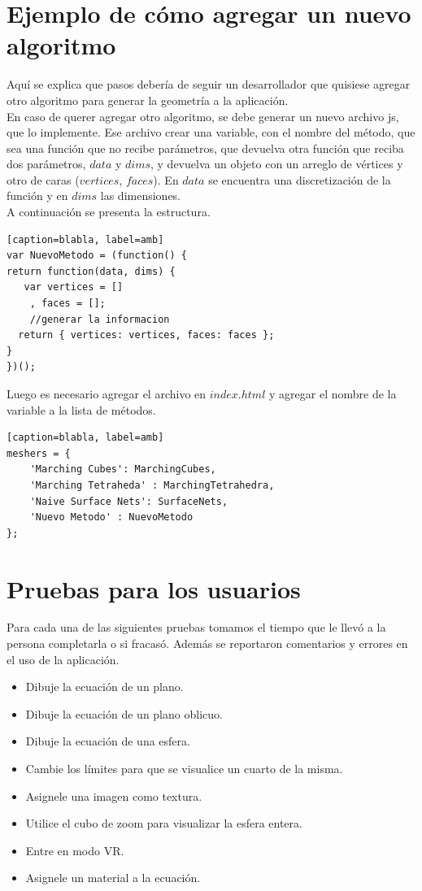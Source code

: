 \documentclass[12pt]{article}
\begin{document}
\section{Ejemplo de cómo agregar un nuevo algoritmo}
Aquí se explica que pasos debería de seguir un desarrollador que quisiese agregar otro algoritmo para generar la geometría a la aplicación.
\\En caso de querer agregar otro algoritmo, se debe generar un nuevo archivo js, que lo implemente. Ese archivo crear una variable, con el nombre del método, que sea una función que no recibe parámetros, que devuelva otra función que reciba dos parámetros, $data$ y $dims$, y devuelva un objeto con un arreglo de vértices y otro de caras ($vertices$, $faces$). En $data$ se encuentra una discretización de la función y en $dims$ las dimensiones.
\\A continuación se presenta la estructura.
\begin{lstlisting}[frame=single][caption=blabla, label=amb]
var NuevoMetodo = (function() {
return function(data, dims) {   
   var vertices = []
    , faces = [];
    //generar la informacion
  return { vertices: vertices, faces: faces };
}
})();
\end{lstlisting}
Luego es necesario agregar el archivo en $index.html$ y agregar el nombre de la variable a la lista de métodos.
\begin{lstlisting}[frame=single][caption=blabla, label=amb]
meshers = {
    'Marching Cubes': MarchingCubes,
    'Marching Tetraheda' : MarchingTetrahedra,
    'Naive Surface Nets': SurfaceNets,
    'Nuevo Metodo' : NuevoMetodo
};
\end{lstlisting}
\clearpage
\section{Pruebas para los usuarios}
Para cada una de las siguientes pruebas tomamos el tiempo que le llevó a la persona completarla o si fracasó. Además se reportaron comentarios y errores en el uso de la aplicación.
\begin{itemize}
\item Dibuje la ecuación de un plano.
\item Dibuje la ecuación de un plano oblicuo.
\item Dibuje la ecuación de una esfera.
\item Cambie los límites para que se visualice un cuarto de la misma.
\item Asignele una imagen como textura.
\item Utilice el cubo de zoom para visualizar la esfera entera.
\item Entre en modo VR.
\item Asignele un material a la ecuación.
\end{itemize}
\clearpage
\end{document}
